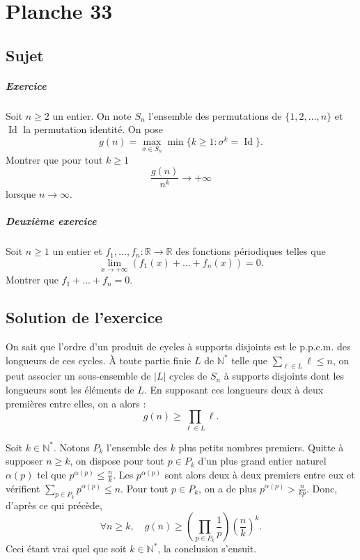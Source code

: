 \chapter{Planche 33}

\section{Sujet}

\paragraph{Exercice}

Soit $n \geqslant 2$ un entier.
On note $S_n$ l'ensemble des permutations de $\{1,2,\dots,n\}$ et $\operatorname{Id}$ la permutation identité.
On pose
$$
g(n) = \max_{\sigma \in S_n} \min \{k \geqslant 1 : \sigma^k = \operatorname{Id}\}.
$$
Montrer que pour tout $k \geqslant 1$
\[\frac{g(n)}{n^k} \to +\infty
\]
lorsque $n \to \infty$.

\paragraph{Deuxième exercice}

Soit $n \geqslant 1$ un entier et $f_1,\dots,f_n : \mathbb R \to \mathbb R$ des fonctions périodiques telles que
$$
\lim_{x\to+\infty} (f_1(x) + \dots + f_n(x)) = 0.
$$
Montrer que $f_1 + \dots + f_n = 0$.

\section{Solution de l'exercice}


On sait que l'ordre d'un produit de cycles à supports disjoints est le p.p.c.m. des longueurs de ces cycles.
À toute partie finie $L$ de $\mathbb N^*$ telle que $\sum_{\ell\in L} \ell \leq n$, on peut associer un sous-ensemble de $|L|$ cycles de $S_n$ à supports disjoints dont les longueurs sont les éléments de $L$.
En supposant ces longueurs deux à deux premières entre elles, on a alors :
$$
g(n) \geq \prod_{\ell \in L} \ell.
$$

Soit $k \in \mathbb N^*$. Notons $P_k$ l'ensemble des $k$ plus petits nombres premiers.
Quitte à supposer $n \geq k$, on dispose pour tout $p \in P_k$ d'un plus grand entier naturel $\alpha(p)$ tel que $p^{\alpha(p)} \leq \frac nk$.
Les $p^{\alpha(p)}$ sont alors deux à deux premiers entre eux et vérifient $\sum_{p\in P_k} p^{\alpha(p)} \leq n$.
Pour tout $p \in P_k$, on a de plus $p^{\alpha(p)} > \frac n{kp}$. Donc, d'après ce qui précède,
$$
\forall n \geq k,\quad
g(n) \geq \left(\prod_{p\in P_k} \frac1p\right)\left(\frac nk\right)^k.
$$
Ceci étant vrai quel que soit $k \in \mathbb N^*$, la conclusion s'ensuit.

